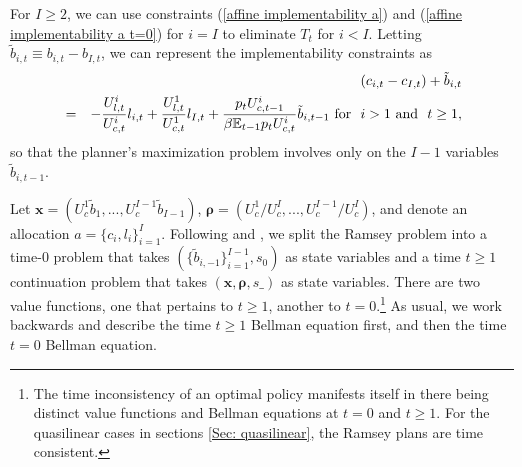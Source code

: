 \documentclass[thmsb,11pt]{article}
\begin{document}
\noindent For $I\geq 2$, we can use constraints (\ref{affine implementability
a}) and (\ref{affine implementability
a t=0}) for  $i=I$ to eliminate $T_{t}$ for $i < I$. Letting $\tilde{b}%
_{i,t}\equiv b_{i,t}-b_{I,t}$, we can represent the implementability constraints
as
\begin{eqnarray}
\label{affine implementability b}
&&\left( c_{i,t}-c_{I,t}\right) +\tilde{b}_{i,t}\\
&=&-\frac{U_{l,t}^{i}}{U_{c,t}^{i}}l_{i,t}+\frac{U^1_{l,t}}{U^1_{c,t}}l_{I,t} +\frac{p_tU_{c,t-1}^{i}}{\beta \mathbb{E}%
_{t-1}p_tU_{c,t}^{i}}\tilde{b}_{i,t-1}\ \text{\rm for \ }i>1 \ \text{\rm and \ } t\geq 1,  \notag
\end{eqnarray}
so that  the planner's
maximization problem involves only on the $I-1$ variables $\tilde{b}_{i,t-1}.$


Let $\bm{x}= \left( U_{c}^{1}\tilde{b}_{1},...,U_{c}^{I-1}\tilde{b}_{I-1}\right)$, $\bm{\rho }=\left( U_{c}^{1}/U_{c}^{I},...,U_{c}^{I-1}/U_{c}^{I}\right) $, and denote an allocation $a=\{c_i,l_i\}^{I}_{i=1}.$
Following \cite{Kydland1980} and \cite{Farhi2010}, we split the Ramsey problem into a time-$0$ problem that takes $(\{\tilde{b}_{i,-1}\}^{I-1}_{i=1}, s_0)$ as state variables
and   a time $t \geq 1$ continuation problem  that takes $(\bm x,\bm \rho,s\_)$ as state variables. There are
two value functions, one that pertains to $t\geq 1$, another to $t=0$.\footnote{The time inconsistency of an optimal policy
manifests itself in there being distinct value functions and Bellman equations at $t =0$ and $t \geq 1$. For the quasilinear cases in sections \ref{Sec: quasilinear}, the Ramsey plans are time consistent.}  As usual, we work backwards and describe the time $t \geq 1$ Bellman equation
first, and then the time $t=0$ Bellman equation.
\end{document}
